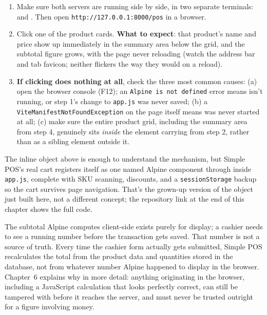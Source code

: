\begin{enumerate}
    list each item and  for the running subtotal:
    \begin{lstlisting}[language=html, title=\lstfile{resources/views/pos/create.blade.php}]
<div class="mt-4 border-t pt-3">
    <template x-for="item in cart" :key="item.id">
        <p x-text="item.name + ' - Rp ' + item.price"></p>
    </template>
    <p class="font-semibold mt-2">Subtotal: Rp <span x-text="subtotal()"></span></p>
</div>
    \end{lstlisting}
  \item Make sure both servers are running side by side, in two separate
    terminals:  and . Then
    open \texttt{http://127.0.0.1:8000/pos} in a browser.
  \item Click one of the product cards. \textbf{What to expect}: that
    product's name and price show up immediately in the summary area
    below the grid, and the subtotal figure grows, with the page never
    reloading (watch the address bar and tab favicon; neither flickers
    the way they would on a reload).
  \item \textbf{If clicking does nothing at all}, check the three most
    common causes: (a) open the browser console (F12); an
    \texttt{Alpine is not defined} error means  isn't
    running, or step 1's change to \texttt{app.js} was never saved;
    (b) a \texttt{ViteManifestNotFoundException} on the page itself means
     was never started at all; (c) make sure the entire
    product grid, including the summary area from step 4, genuinely sits
    \textit{inside} the element carrying  from step 2, rather
    than as a sibling element outside it.
\end{enumerate}

The inline  object above is enough to understand the
mechanism, but Simple POS's real cart registers itself as one named
Alpine component through  inside
\texttt{app.js}, complete with SKU scanning, discounts, and a
\texttt{sessionStorage} backup so the cart survives page navigation.
That's the grown-up version of the  object just built here,
not a different concept; the repository link at the end of this chapter
shows the full code.

The subtotal Alpine computes client-side exists purely for display; a
cashier needs to see a running number before the transaction gets saved.
That number is not a source of truth. Every time the cashier form actually
gets submitted, Simple POS recalculates the total from the product data
and quantities stored in the database, not from whatever number Alpine
happened to display in the browser. Chapter~6 explains why in more detail:
anything originating in the browser, including a JavaScript calculation
that looks perfectly correct, can still be tampered with before it reaches
the server, and must never be trusted outright for a figure involving
money.

